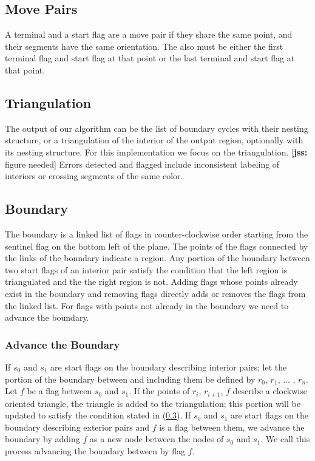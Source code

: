 \documentclass[11pt]{article}
\def\jss#1{{\footnotesize [{\bf jss:} #1]}}
\begin{document}
\subsection{Move Pairs}
A terminal and a start flag are a move pair if they share the same point, and their segments have the same orientation.
The also must be either the first terminal flag and start flag at that point or the last terminal and start flag at that point.


\subsection{Triangulation}
The output of our algorithm can be the list of boundary cycles with their nesting structure, or a triangulation of the interior of the output region, optionally with its nesting structure. For this implementation we focus on the triangulation. \jss{figure needed}
Errors detected and flagged include inconsistent labeling of interiors or crossing segments of the same color. 

\subsection{Boundary} \label{sec boundary}
The boundary is a linked list of flags in counter-clockwise order starting from the sentinel flag on the bottom left of the plane.
The points of the flags connected by the links of the boundary indicate a region.
Any portion of the boundary between two start flags of an interior pair satisfy the condition that the left region is triangulated and the the right region is not.
Adding flags whose points already exist in the boundary and removing flags directly adds or removes the flags from the linked list.
For flags with points not already in the boundary we need to advance the boundary.

\subsubsection{Advance the Boundary}
If $s_0$ and $s_1$ are start flags on the boundary describing interior pairs; let the portion of the boundary between and including them be defined by $r_0$, $r_1$, ... , $r_n$.
Let $f$ be a flag between $s_0$ and $s_1$.
If the points of $r_i$, $r_{i+1}$, $f$ describe a clockwise oriented triangle, the triangle is added to the triangulation; this portion will be updated to satisfy the condition stated in (\ref{sec boundary}).
If $s_0$ and $s_1$ are start flags on the boundary describing exterior pairs and $f$ is a flag between them,
we advance the boundary by adding $f$ as a new node between the nodes of $s_0$ and $s_1$.
We call this process advancing the boundary between by flag $f$.
\end{document}
